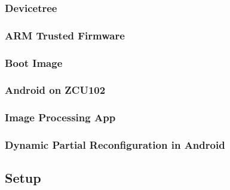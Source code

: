 \subsubsection{Devicetree}\label{sssec:devicetree}

%
\subsubsection{ARM Trusted Firmware}\label{sssec:atf}

%
\subsubsection{Boot Image}\label{sssec:bootimage}

%
\subsubsection{Android on ZCU102}\label{sssec:androidonzcu102}

%
\subsubsection{Image Processing App}\label{sssec:imageprocessingapp}

%
\subsubsection{Dynamic Partial Reconfiguration in Android}\label{sssec:dynamicpartialreconfiguration}



\subsection{Setup}\label{ssec:setup}
